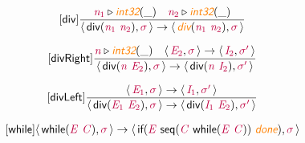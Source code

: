 \documentclass[10pt,leqno,fleqn]{article}
\newcommand{\artVariable}[1]{\mbox{\color{purple}\em #1\/}}
\newcommand{\artConstructor}[1]{\mbox{\sf #1}}
\newcommand{\artSpecial}[1]{\mbox{\color{orange}\sf\em #1}}
\begin{document}
\begin{equation}
\tag*{[\artConstructor{\sf div}]}
\begin{split}\frac{ \artVariable{n$_{1}$}\triangleright \artSpecial{int32}(\_) \quad  \artVariable{n$_{2}$}\triangleright \artSpecial{int32}(\_) }{\langle\, \artConstructor{\sf div}(\artVariable{n$_{1}$}\ \artVariable{n$_{2}$}), \artVariable{$\sigma$}\,\rangle \rightarrow \langle\, \artSpecial{div}(\artVariable{n$_{1}$}\ \artVariable{n$_{2}$}), \artVariable{$\sigma$}\,\rangle }
\end{split}
\end{equation}

\begin{equation}
\tag*{[\artConstructor{\sf divRight}]}
\begin{split}\frac{ \artVariable{n}\triangleright \artSpecial{int32}(\_) \quad \langle\, \artVariable{E$_{2}$}, \artVariable{$\sigma$}\,\rangle \rightarrow \langle\, \artVariable{I$_{2}$}, \artVariable{$\sigma$\/$^\prime$}\,\rangle }{\langle\, \artConstructor{\sf div}(\artVariable{n}\ \artVariable{E$_{2}$}), \artVariable{$\sigma$}\,\rangle \rightarrow \langle\, \artConstructor{\sf div}(\artVariable{n}\ \artVariable{I$_{2}$}), \artVariable{$\sigma$\/$^\prime$}\,\rangle }
\end{split}
\end{equation}

\begin{equation}
\tag*{[\artConstructor{\sf divLeft}]}
\begin{split}\frac{\langle\, \artVariable{E$_{1}$}, \artVariable{$\sigma$}\,\rangle \rightarrow \langle\, \artVariable{I$_{1}$}, \artVariable{$\sigma$\/$^\prime$}\,\rangle }{\langle\, \artConstructor{\sf div}(\artVariable{E$_{1}$}\ \artVariable{E$_{2}$}), \artVariable{$\sigma$}\,\rangle \rightarrow \langle\, \artConstructor{\sf div}(\artVariable{I$_{1}$}\ \artVariable{E$_{2}$}), \artVariable{$\sigma$\/$^\prime$}\,\rangle }
\end{split}
\end{equation}

\begin{equation}
\tag*{[\artConstructor{\sf while}]}
\begin{split}\langle\, \artConstructor{\sf while}(\artVariable{E}\ \artVariable{C}), \artVariable{$\sigma$}\,\rangle \rightarrow \langle\, \artConstructor{\sf if}(\artVariable{E}\ \artConstructor{\sf seq}(\artVariable{C}\ \artConstructor{\sf while}(\artVariable{E}\ \artVariable{C}))\ \artSpecial{done}), \artVariable{$\sigma$}\,\rangle 
\end{split}
\end{equation}
\end{document}
